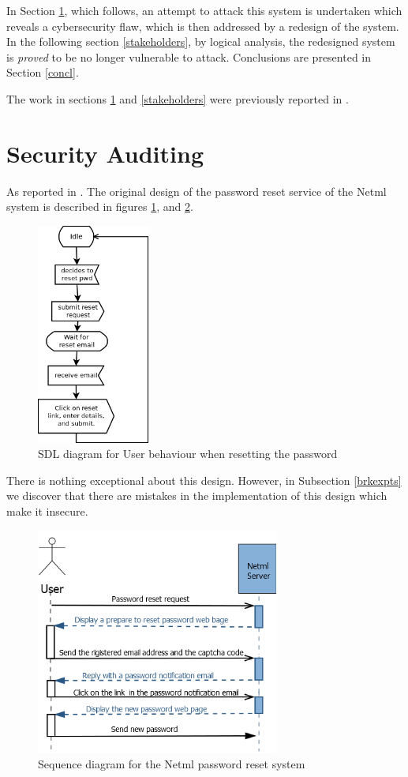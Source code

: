 In Section \ref{secadit}, which follows, an attempt to attack this system is undertaken which reveals a cybersecurity flaw, which is then addressed by a redesign of the system. In the following section \ref{stakeholders}, by logical analysis, the redesigned system is {\em proved} to be no longer vulnerable to attack. Conclusions are presented in Section \ref{concl}. 

The work in sections \ref{secadit} and \ref{stakeholders} were previously reported in \cite{sheniar2018experiments}.


\section{Security Auditing}\label{secadit}

As reported in \cite{sheniar2018experiments}. The original design of the password reset
service of the Netml system is described in figures \ref{usersdl}, and \ref{seqdgnetmlorg}.
\begin{figure}
\begin{center}
\vspace{5mm}
\includegraphics[width=37mm]{figures/resetpwd.png}
\caption{SDL diagram for User behaviour when resetting the password}
\label{usersdl}
\end{center}
\end{figure}

There is nothing exceptional about this design. However, in Subsection \ref{brkexpts}
we discover that there are mistakes in the implementation of this design which
make it insecure.

\begin{figure}
	\centering
		\includegraphics[width=8cm]{figures/User.png}
\caption{Sequence diagram for the Netml password reset  system }
\label{seqdgnetmlorg}
\end{figure}
	

